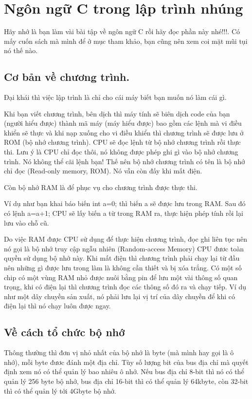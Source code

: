 \chapter{Ngôn ngữ C trong lập trình nhúng}

Hãy nhớ là bạn làm vài bài tập về ngôn ngữ C rồi hãy đọc phần này nhé!!!. Có mấy cuốn sách mà mình để ở mục tham khảo, bạn cũng nên xem coi mặt mũi tụi nó thế nào.
\section{Cơ bản về chương trình.}
 
Đại khái thì việc lập trình là chỉ cho cái máy biết bạn muốn nó làm cái gì.

Khi bạn viết chương trình, bên dịch thì máy tính sẽ biên dịch code của bạn (người hiểu được) thành mã máy (máy hiểu được) bao gồm các lệnh mà vi điều khiển sẽ thực và khi nạp xuống cho vi điều khiển thì chương trình sẽ được lưu ở ROM (bộ nhớ chương trình). CPU sẽ đọc lệnh từ bộ nhớ chương trình rồi thực thi. Lưu ý là CPU chỉ đọc thôi, nó không được phép ghi gì vào bộ nhớ chương trình. Nó không thể cãi lệnh bạn! Thế nên bộ nhớ chương trình có tên là bộ nhớ chỉ đọc (Read-only memory, ROM). Nó vẫn còn đấy khi mất điện.

Còn bộ nhớ RAM là để phục vụ cho chương trình được thực thi.

Ví dụ như bạn khai báo biến int a=0; thì biến a sẽ được lưu trong RAM. Sau đó có lệnh a=a+1; CPU sẽ lấy biến a từ trong RAM ra, thực hiện phép tính rồi lại lưu vào chỗ cũ.

Do việc RAM được CPU sử dụng để thực hiện chương trình, đọc ghi liên tục nên nó gọi là bộ nhớ truy cập ngẫu nhiên (Random-access Memory) CPU đươc toàn quyền sử dụng bộ nhớ này. Khi mất điện thì chương trình phải chạy lại từ đầu nên những gì được lưu trong làm là không cần thiết và bị xóa trắng. Có một số chip có một vùng RAM nhỏ được nuôi bằng pin để lưu một vài thông số quan trọng, khi có điện lại thì chương trình đọc các thông số đó ra và chạy tiếp. Ví dụ như một dây chuyền sản xuất, nó phải lưu lại vị trí của dây chuyền để khi có điện lại thì nó chạy luôn được ngay.

\section{Về cách tổ chức bộ nhớ}

Thông thường thì đơn vị nhỏ nhất của bộ nhớ là byte (mà mình hay gọi là ô nhớ), mỗi byte đươc đánh một địa chỉ. Tùy số lượng bit của bus địa chỉ mà quyết định xem nó có thể quản lý bao nhiêu ô nhớ. Nếu bus địa chỉ 8-bit thì nó có thể quản lý 256 byte bộ nhớ, bus địa chỉ 16-bit thì có thể quản lý 64kbyte, còn 32-bit thì có thể quản lý tới 4Gbyte bộ nhớ. 

